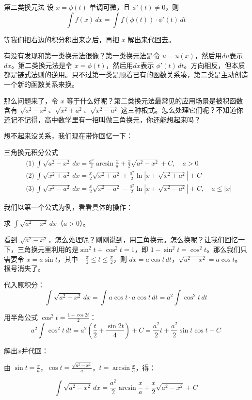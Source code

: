 \begin{theorem}{第二类换元法}{}
设 $x = \phi(t)$ 单调可微，且 $\phi'(t) \neq 0$，则
\[
\int f(x)\, dx = \int f(\phi(t)) \cdot \phi'(t)\, dt
\]
\end{theorem}

等我们把右边的积分积出来之后，再把 $x$ 解出来代回去。

有没有发现和第一类换元法很像？第一类换元法是令 $u = u(x)$，然后用$du$表示$dx$。第二类换元法是令 $x = \phi(t)$，然后用$dx$表示 $\phi'(t)\,dt$。方向相反，但本质都是链式法则的逆用。只不过第一类是顺着已有的函数关系凑，第二类是主动创造一个新的函数关系来换。

那么问题来了，令 $x$ 等于什么好呢？第二类换元法最常见的应用场景是被积函数含有 $\sqrt{a^2 - x^2}$、$\sqrt{x^2 + a^2}$、$\sqrt{x^2 - a^2}$ 这三种根式。怎么处理它们呢？不知道你还记不记得，高中数学里有一招叫做三角换元，你还能想起来吗？

想不起来没关系，我们现在带你回忆一下：

\begin{theorem}{三角换元积分公式}{}
\[
\begin{aligned}
&\text{(1)}\ \int \sqrt{a^2 - x^2}\, dx = \frac{a^2}{2}\arcsin\frac{x}{a} + \frac{x}{2}\sqrt{a^2-x^2} + C, \quad a>0 \\[4pt]
&\text{(2)}\ \int \sqrt{x^2 + a^2}\, dx = \frac{x}{2}\sqrt{x^2+a^2} + \frac{a^2}{2}\ln|x + \sqrt{x^2+a^2}| + C \\[4pt]
&\text{(3)}\ \int \sqrt{x^2 - a^2}\, dx = \frac{x}{2}\sqrt{x^2-a^2} - \frac{a^2}{2}\ln|x + \sqrt{x^2-a^2}| + C, \quad a \leq |x|
\end{aligned}
\]
\end{theorem}

我们以第一个公式为例，看看具体的操作：

\begin{myexample}
  求 $\int \sqrt{a^2 - x^2}\, dx$（$a > 0$）。

  看到 $\sqrt{a^2 - x^2}$，怎么处理呢？刚刚说到，用三角换元。怎么换呢？让我们回忆一下，三角换元里利用的是$\sin^2 t + \cos^2 t = 1$，即 $1 - \sin^2 t = \cos^2 t$。那么我们只需要令 $x = a\sin t$，其中 $-\frac{\pi}{2} \leq t \leq \frac{\pi}{2}$，则 $dx = a\cos t\, dt$，$\sqrt{a^2 - x^2} = a\cos t$。根号消失了。

  代入原积分：
  \[
  \int \sqrt{a^2 - x^2}\, dx = \int a\cos t \cdot a\cos t\, dt = a^2 \int \cos^2 t\, dt
  \]

  用半角公式 $\cos^2 t = \frac{1 + \cos 2t}{2}$：
  \[
  a^2 \int \cos^2 t\, dt = a^2\!(\frac{t}{2} + \frac{\sin 2t}{4}) + C = \frac{a^2}{2}t + \frac{a^2}{2}\sin t\cos t + C
  \]

  解出$x$并代回：

  由 $\sin t = \frac{x}{a}$，$\cos t = \frac{\sqrt{a^2-x^2}}{a}$，$t = \arcsin\frac{x}{a}$，得：

  \[
  \int \sqrt{a^2 - x^2}\, dx = \frac{a^2}{2}\arcsin\frac{x}{a} + \frac{x}{2}\sqrt{a^2-x^2} + C
  \]
\end{myexample}

